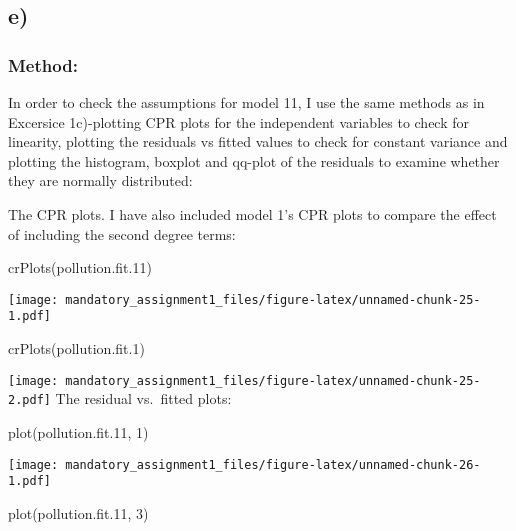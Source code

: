 \documentclass[
]{article}
\newenvironment{Shaded}{\begin{snugshade}}{\end{snugshade}}
\newcommand{\DecValTok}[1]{\textcolor[rgb]{0.00,0.00,0.81}{#1}}
\newcommand{\FloatTok}[1]{\textcolor[rgb]{0.00,0.00,0.81}{#1}}
\newcommand{\FunctionTok}[1]{\textcolor[rgb]{0.00,0.00,0.00}{#1}}
\newcommand{\NormalTok}[1]{#1}
\begin{document}
\hypertarget{e}{%
\subsection{e)}\label{e}}

\hypertarget{method-4}{%
\subsubsection{Method:}\label{method-4}}

In order to check the assumptions for model 11, I use the same methods
as in Excersice 1c)-plotting CPR plots for the independent variables to
check for linearity, plotting the residuals vs fitted values to check
for constant variance and plotting the histogram, boxplot and qq-plot of
the residuals to examine whether they are normally distributed:

The CPR plots. I have also included model 1's CPR plots to compare the
effect of including the second degree terms:

\begin{Shaded}
\begin{Highlighting}[]
\FunctionTok{crPlots}\NormalTok{(pollution.fit}\FloatTok{.11}\NormalTok{)}
\end{Highlighting}
\end{Shaded}

\texttt{[image: mandatory\_assignment1\_files/figure-latex/unnamed-chunk-25-1.pdf]}

\begin{Shaded}
\begin{Highlighting}[]
\FunctionTok{crPlots}\NormalTok{(pollution.fit}\FloatTok{.1}\NormalTok{)}
\end{Highlighting}
\end{Shaded}

\texttt{[image: mandatory\_assignment1\_files/figure-latex/unnamed-chunk-25-2.pdf]}
The residual vs.~fitted plots:

\begin{Shaded}
\begin{Highlighting}[]
\FunctionTok{plot}\NormalTok{(pollution.fit}\FloatTok{.11}\NormalTok{, }\DecValTok{1}\NormalTok{)}
\end{Highlighting}
\end{Shaded}

\texttt{[image: mandatory\_assignment1\_files/figure-latex/unnamed-chunk-26-1.pdf]}

\begin{Shaded}
\begin{Highlighting}[]
\FunctionTok{plot}\NormalTok{(pollution.fit}\FloatTok{.11}\NormalTok{, }\DecValTok{3}\NormalTok{)}
\end{Highlighting}
\end{Shaded}
\end{document}
